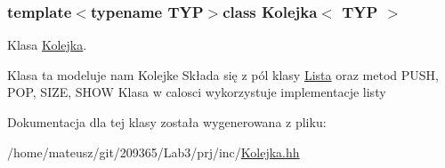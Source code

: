 \subsubsection*{template$<$typename T\-Y\-P$>$class Kolejka$<$ T\-Y\-P $>$}

Klasa \hyperlink{class_kolejka}{Kolejka}. 

Klasa ta modeluje nam Kolejke Składa się z pól klasy \hyperlink{class_lista}{Lista} oraz metod P\-U\-S\-H, P\-O\-P, S\-I\-Z\-E, S\-H\-O\-W Klasa w calosci wykorzystuje implementacje listy 

Dokumentacja dla tej klasy została wygenerowana z pliku\-:\begin{DoxyCompactItemize}
\item 
/home/mateusz/git/209365/\-Lab3/prj/inc/\hyperlink{_kolejka_8hh}{Kolejka.\-hh}\end{DoxyCompactItemize}
